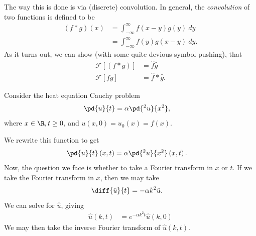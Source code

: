 \documentclass[10pt]{mypackage}
\begin{document}
The way this is done is via (discrete) convolution. In general, the \textit{convolution} of two functions is defined to be
\begin{align*}
  \left( f\ast g \right)(x) &= \int_{-\infty}^{\infty} f\left( x-y \right)g(y)\:dy\\
                            &= \int_{-\infty}^{\infty} f(y)g\left( x-y \right)\:dy.
\end{align*}
As it turns out, we can show (with some quite devious symbol pushing), that
\begin{align*}
  \mathcal{F}\left[ \left( f\ast g \right) \right] &= \hat{f}\hat{g}\\
  \mathcal{F}\left[ fg \right] &= \hat{f}\ast \hat{g}.
\end{align*}
\begin{example}
  Consider the heat equation Cauchy problem
  \begin{align*}
    \pd{u}{t} &= \alpha \pd{^2u}{x^2},
  \end{align*}
  where $x\in\R,t\geq 0$, and $u\left(x,0\right) = u_0(x) = f(x)$.\newline

  We rewrite this function to get
  \begin{align*}
    \pd{u}{t}\left( x,t \right) &= \alpha \pd{^2u}{x^2}\left( x,t \right).
  \end{align*}
  Now, the question we face is whether to take a Fourier transform in $x$ or $t$. If we take the Fourier transform in $x$, then we may take
  \begin{align*}
    \diff{\hat{u}}{t} &= -\alpha k^2 \hat{u}.
  \end{align*}
  We can solve for $\hat{u}$, giving
  \begin{align*}
    \hat{u}\left( k,t \right) &= e^{-\alpha k^2 t} \hat{u}\left( k,0 \right)
  \end{align*}
  We may then take the inverse Fourier transform of $\hat{u}\left( k,t \right)$.\newline


\end{example}
\end{document}
